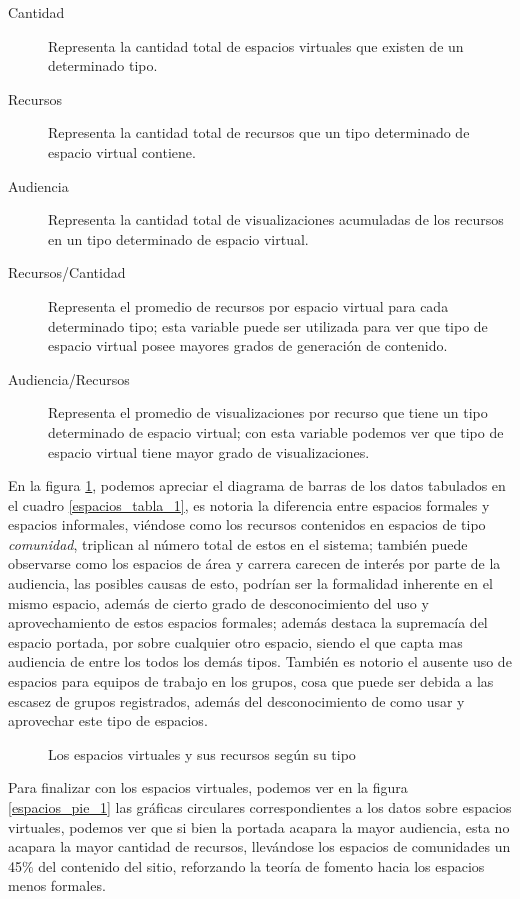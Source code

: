 \begin{description}
\item [Cantidad] Representa la cantidad total de espacios virtuales que existen
de un determinado tipo.
\item [Recursos] Representa la cantidad total de recursos que un tipo
determinado de espacio virtual contiene.
\item [Audiencia] Representa la cantidad total de visualizaciones acumuladas de
los recursos en un tipo determinado de espacio virtual.
\item [Recursos/Cantidad] Representa el promedio de recursos por espacio virtual
para cada determinado tipo; esta variable puede ser utilizada para ver que tipo
de espacio virtual posee mayores grados de generación de contenido.
\item [Audiencia/Recursos] Representa el promedio de visualizaciones por recurso
que tiene un tipo determinado de espacio virtual; con esta variable podemos ver
que tipo de espacio virtual tiene mayor grado de visualizaciones.
\end{description}

En la figura \ref{espacios_bars_1}, podemos apreciar el diagrama de barras de
los datos tabulados en el cuadro \ref{espacios_tabla_1}, es notoria la
diferencia entre espacios formales y espacios informales, viéndose como los
recursos contenidos en espacios de tipo \emph{comunidad}, triplican al número
total de estos en el sistema; también puede observarse como los espacios de área
y carrera carecen de interés por parte de la audiencia, las posibles causas de
esto, podrían ser la formalidad inherente en el mismo espacio, además de cierto
grado de desconocimiento del uso y aprovechamiento de estos espacios formales;
además destaca la supremacía del espacio portada, por sobre cualquier otro
espacio, siendo el que capta mas audiencia de entre los todos los demás tipos.
También es notorio el ausente uso de espacios para equipos de trabajo en los
grupos, cosa que puede ser debida a las escasez de grupos registrados, además
del desconocimiento de como usar y aprovechar este tipo de espacios.

\begin{figure}
\centering

\caption{Los espacios virtuales y sus recursos según su tipo}
\label{espacios_bars_1}
\end{figure}

Para finalizar con los espacios virtuales, podemos ver en la figura
\ref{espacios_pie_1} las gráficas circulares correspondientes a los datos sobre
espacios virtuales, podemos ver que si bien la portada acapara la mayor
audiencia, esta no acapara la mayor cantidad de recursos, llevándose los
espacios de comunidades un 45\% del contenido del sitio, reforzando la teoría de
fomento hacia los espacios menos formales.

